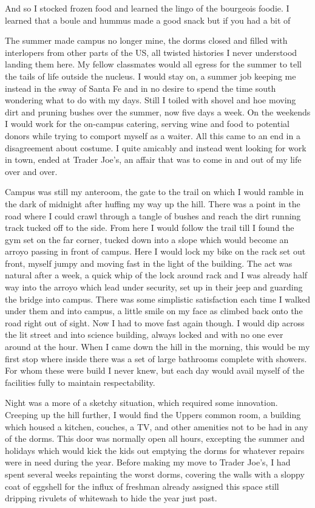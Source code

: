 \documentclass[ebook, 10pt, openright, onecolumn]{memoir}
\newcommand*\td[1]{
  \todo[inline]{
     #1 
  }
}
\newcommand*\finish{\td{ ----- Finish this section -----}}
\begin{document}
\finish

And so I stocked frozen food and learned the lingo of the bourgeois foodie. I
learned that a boule and hummus made a good snack but if you had a bit of


The summer made campus no longer mine, the dorms closed and filled with
interlopers from other parts of the US, all twisted histories I never understood
landing them here.  My fellow classmates would all egress for the summer to tell
the tails of life outside the nucleus.  I would stay on, a summer job
keeping me instead in the sway of Santa Fe and in no desire to spend the time
south wondering what to do with my days.  Still I toiled with shovel and hoe
moving dirt and pruning bushes over the summer, now five days a week.  On the
weekends I would work for the on-campus catering, serving wine and food to
potential donors while trying to comport myself as a waiter.  All this came to
an end in a disagreement about costume.  I quite amicably and instead went
looking for work in town, ended at Trader Joe's, an affair that was to come in
and out of my life over and over.

\finish{}


Campus was still my anteroom, the gate to the trail on which I would ramble in
the dark of midnight after huffing my way up the hill.  There was a point in the
road where I could crawl through a tangle of bushes and reach the dirt running
track tucked off to the side.  From here I would follow the trail till I found
the gym set on the far corner, tucked down into a slope which would become an
arroyo passing in front of campus.  Here I would lock my bike on the rack set
out front, myself jumpy and moving fast in the light of the building.  The act
was natural after a week, a quick whip of the lock around rack and I was already
half way into the arroyo which lead under security, set up in their jeep and
guarding the bridge into campus.  There was some simplistic satisfaction each
time I walked under them and into campus, a little smile on my face as climbed
back onto the road right out of sight.  Now I had to move fast again though.  I
would dip across the lit street and into science building, always locked and
with no one ever around at the hour.  When I came down the hill in the morning,
this would be my first stop where inside there was a set of large bathrooms
complete with showers.  For whom these were build I never knew, but each day
would avail myself of the facilities fully to maintain respectability.

Night was a more of a sketchy situation, which required some innovation.
Creeping up the hill further, I would find the Uppers common room, a building
which housed a kitchen, couches, a TV, and other amenities not to be had in any
of the dorms.  This door was normally open all hours, excepting the summer and
holidays which would kick the kids out emptying the dorms for whatever repairs
were in need during the year.  Before making my move to Trader Joe's, I had
spent several weeks repainting the worst dorms, covering the walls with a sloppy
coat of eggshell for the influx of freshman already assigned this space still
dripping rivulets of whitewash to hide the year just past.
\end{document}
